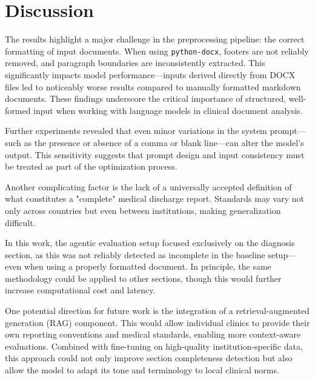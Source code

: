 \section{Discussion}

The results highlight a major challenge in the preprocessing pipeline: the correct formatting of input documents. When using \texttt{python-docx}, footers are not reliably removed, and paragraph boundaries are inconsistently extracted. This significantly impacts model performance—inputs derived directly from DOCX files led to noticeably worse results compared to manually formatted markdown documents. These findings underscore the critical importance of structured, well-formed input when working with language models in clinical document analysis.

Further experiments revealed that even minor variations in the system prompt—such as the presence or absence of a comma or blank line—can alter the model's output. This sensitivity suggests that prompt design and input consistency must be treated as part of the optimization process.

Another complicating factor is the lack of a universally accepted definition of what constitutes a "complete" medical discharge report. Standards may vary not only across countries but even between institutions, making generalization difficult.

In this work, the agentic evaluation setup focused exclusively on the diagnosis section, as this was not reliably detected as incomplete in the baseline setup—even when using a properly formatted document. In principle, the same methodology could be applied to other sections, though this would further increase computational cost and latency.

One potential direction for future work is the integration of a retrieval-augmented generation (RAG) component. This would allow individual clinics to provide their own reporting conventions and medical standards, enabling more context-aware evaluations. Combined with fine-tuning on high-quality institution-specific data, this approach could not only improve section completeness detection but also allow the model to adapt its tone and terminology to local clinical norms.

